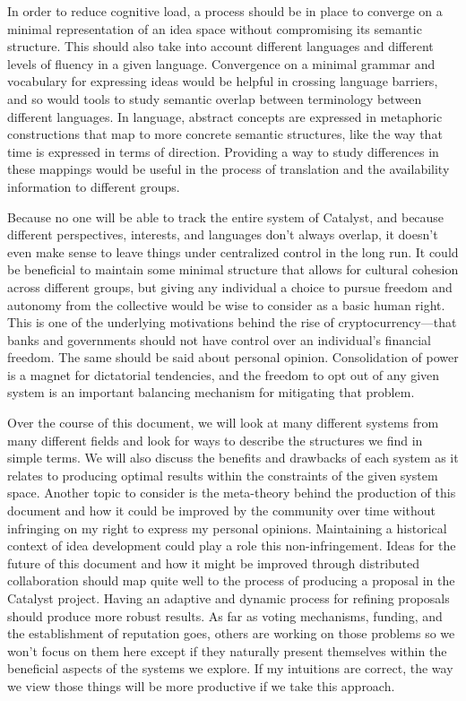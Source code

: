 \documentclass[10pt]{article}
\begin{document}
In order to reduce cognitive load, a process should be in place to converge on a minimal representation of an idea space without compromising its semantic structure.
This should also take into account different languages and different levels of fluency in a given language.
Convergence on a minimal grammar and vocabulary for expressing ideas would be helpful in crossing language barriers, and so would tools to study semantic overlap between terminology between different languages.
In language, abstract concepts are expressed in metaphoric constructions that map to more concrete semantic structures, like the way that time is expressed in terms of direction.
Providing a way to study differences in these mappings would be useful in the process of translation and the availability information to different groups.

Because no one will be able to track the entire system of Catalyst, and because different perspectives, interests, and languages don't always overlap, it doesn't even make sense to leave things under centralized control in the long run.
It could be beneficial to maintain some minimal structure that allows for cultural cohesion across different groups, but giving any individual a choice to pursue freedom and autonomy from the collective would be wise to consider as a basic human right.
This is one of the underlying motivations behind the rise of cryptocurrency---that banks and governments should not have control over an individual's financial freedom.
The same should be said about personal opinion.
Consolidation of power is a magnet for dictatorial tendencies, and the freedom to opt out of any given system is an important balancing mechanism for mitigating that problem. 

Over the course of this document, we will look at many different systems from many different fields and look for ways to describe the structures we find in simple terms.
We will also discuss the benefits and drawbacks of each system as it relates to producing optimal results within the constraints of the given system space.
Another topic to consider is the meta-theory behind the production of this document and how it could be improved by the community over time without infringing on my right to express my personal opinions.
Maintaining a historical context of idea development could play a role this non-infringement.
Ideas for the future of this document and how it might be improved through distributed collaboration should map quite well to the process of producing a proposal in the Catalyst project.
Having an adaptive and dynamic process for refining proposals should produce more robust results.
As far as voting mechanisms, funding, and the establishment of reputation goes, others are working on those problems so we won't focus on them here except if they naturally present themselves within the beneficial aspects of the systems we explore.
If my intuitions are correct, the way we view those things will be more productive if we take this approach.
\end{document}
